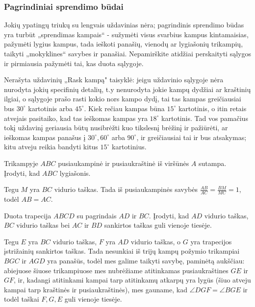 \subsubsection{Pagrindiniai sprendimo būdai}

Jokių ypatingų triukų su lengvais uždavinias nėra;
pagrindinis sprendimo būdas yra turbūt „sprendimas kampais“
- sužymėti visus svarbius kampus kintamaisias, pažymėti
lygius kampus, tada ieškoti panašių, vienodų ar lygiašonių trikampių,
taikyti „mokyklines“ savybes ir panašiai. Nepamirškite
atidžiai perskaityti sąlygos  ir pirmiausia pažymėti tai,
kas duota sąlygoje.

Nerašyta uždavinių „Rask kampą" taisyklė: jeigu uždavinio
sąlygoje nėra nurodyta jokių specifinių detalių, t.y
nenurodyta jokie kampų dydžiai ar kraštinių ilgiai, o
sąlygoje prašo rasti kokio nors kampo dydį, tai tas kampas
greičiausiai bus $30^\circ$ kartotinis arba $45^\circ$. Kiek rečiau kampas būna
$15^\circ$ kartotinis, o itin retais atvejais pasitaiko, kad tas ieškomas kampas yra
$18^\circ$ kartotinis. Tad vos pamačius tokį uždavinį geriausia
būtų nusibrėžti kuo tikslesnį brėžinį ir pažiūrėti, ar
ieškomas kampas panašus į $30^\circ, 60^\circ$ arba
$90^\circ$, ir greičiausiai tai ir bus atsakymas; kitu atveju
reikia bandyti kitus $15^\circ$ kartotinius.

\begin{pav}
  Trikampyje $ABC$ pusiaukampinė ir pusiaukraštinė iš viršūnės
  $A$ sutampa. Įrodyti, kad $ABC$ lygiašonis.
\end{pav}

\begin{sprendimas}
  Tegu $M$ yra $BC$ vidurio taškas. Tada iš pusiaukampinės savybės
  $\frac{AB}{AC} = \frac{BM}{MC} = 1$, todėl $AB = AC$.
\end{sprendimas}

\begin{pav}
  Duota trapecija $ABCD$ su pagrindais $AD$ ir $BC$. Įrodyti, kad $AD$
  vidurio taškas, $BC$ vidurio taškas bei $AC$ ir $BD$ sankirtos taškas
  guli vienoje tiesėje. 
\end{pav}

\begin{sprendimas}
  Tegu $E$ yra $BC$ vidurio taškas, $F$ yra $AD$ vidurio taškas, o $G$ yra
  trapecijos įstrižainių sankirtos taškas.  Tada nesunkiai iš trijų kampų
  požymio trikampiai $BGC$ ir $AGD$ yra panašūs, todėl mes galime taikyti
  savybę, paminėtą aukščiau: abiejuose šiuose trikampiuose mes nubrėžiame
  atitinkamas pusiaukraštines $GE$ ir $GF$, ir, kadangi atitinkami kampai
  tarp atitinkamų atkarpų yra lygūs (šiuo atveju kampai tarp kraštinės ir
  pusiaukraštinės), mes gauname, kad $\angle DGF = \angle BGE$ ir todėl taškai
  $F, G, E$ guli vienoje tiesėje. 
\end{sprendimas}

